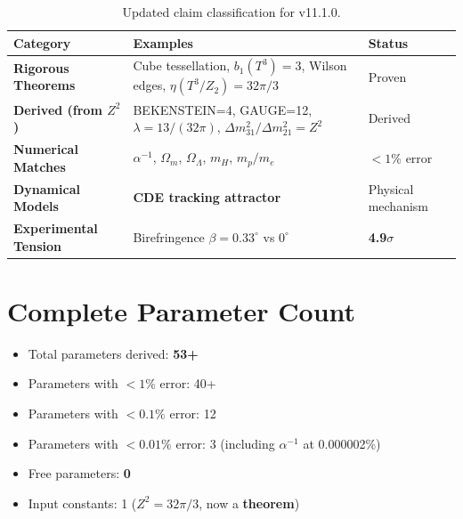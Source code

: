 \documentclass[11pt,a4paper]{article}
\theoremstyle{plain}
\theoremstyle{definition}
\theoremstyle{remark}
\begin{document}
\begin{table}[h!]
\centering
\begin{tabular}{lll}
\toprule
\textbf{Category} & \textbf{Examples} & \textbf{Status} \\
\midrule
\textbf{Rigorous Theorems} & Cube tessellation, $b_1(T^3)=3$, Wilson edges, \textbf{$\eta(T^3/Z_2)=32\pi/3$} & Proven \\
\textbf{Derived (from $Z^2$)} & BEKENSTEIN=4, GAUGE=12, \textbf{$\lambda=13/(32\pi)$}, \textbf{$\Delta m^2_{31}/\Delta m^2_{21}=Z^2$} & Derived \\
\textbf{Numerical Matches} & $\alpha^{-1}$, $\Omega_m$, $\Omega_\Lambda$, $m_H$, $m_p/m_e$ & $< 1\%$ error \\
\textbf{Dynamical Models} & \textbf{CDE tracking attractor} & Physical mechanism \\
\textbf{Experimental Tension} & Birefringence $\beta = 0.33^\circ$ vs $0^\circ$ & \textbf{4.9$\sigma$} \\
\bottomrule
\end{tabular}
\caption{Updated claim classification for v11.1.0.}
\end{table}

\section{Complete Parameter Count}

\begin{itemize}
  \item Total parameters derived: \textbf{53+}
  \item Parameters with $<1\%$ error: 40+
  \item Parameters with $<0.1\%$ error: 12
  \item Parameters with $<0.01\%$ error: 3 (including $\alpha^{-1}$ at 0.000002\%)
  \item Free parameters: \textbf{0}
  \item Input constants: 1 ($Z^2 = 32\pi/3$, now a \textbf{theorem})
\end{itemize}
\end{document}
